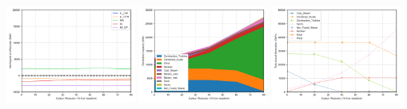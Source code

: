 \documentclass[xcolor=dvipsnames]{beamer}
\begin{document}
\begin{frame}
  \includegraphics[width=0.32\textwidth]{includes/no_leakage_shutdowns_agg_exim.png}
  \includegraphics[width=0.32\textwidth]{includes/no_leakage_shutdowns_agg_capacity_cntlreg.png}
  \includegraphics[width=0.32\textwidth]{includes/no_leakage_shutdowns_agg_generation_cntlreg.png}
\end{frame}
\end{document}
